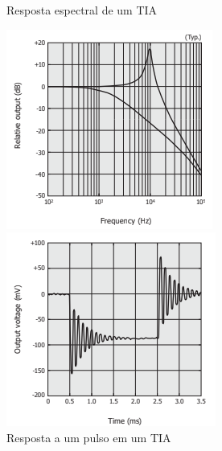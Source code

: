 \begin{figure}[!h]
    \begin{minipage}{0.4\textwidth}
    \centering
    \caption{\label{figura_respostaTIA}Resposta espectral de um TIA}
	\includegraphics[scale=0.8]{Imagens/RespostaEspectralTIA.png}
	\end{minipage}
	 \hfill
  \begin{minipage}{0.4\textwidth}
    \centering
    \caption{\label{figura_respostaTIA2}Resposta a um pulso em um TIA}
    \includegraphics[scale=0.8]{Imagens/RespostaEspectralTIA2.png}
  \end{minipage}
  
	
\end{figure}

\begin{figure}[!h]
    \centering
    
	\begin{center}
	    
	\end{center}
\end{figure}